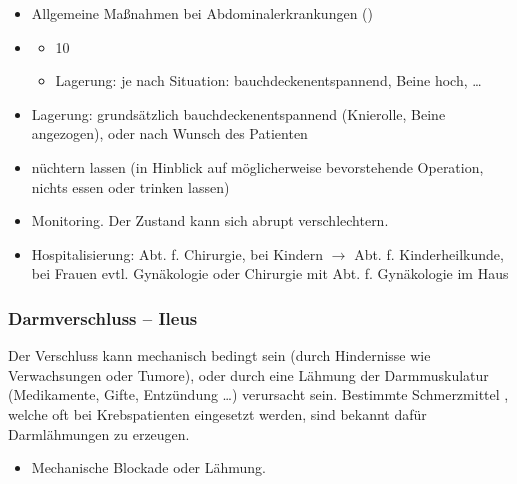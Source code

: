 {\label{m:akutes-abdomen}}
{
\begin{itemize}
  \item Allgemeine Maßnahmen bei Abdominalerkrankungen
  ()
  \item {} \TxBeiVit
  \TxMassVitBes
  \begin{itemize}
    \item {} 10\LMin
    \item Lagerung: je nach Situation: bauchdeckenentspannend,
    Beine hoch, \ldots
  \end{itemize}
  \item Lagerung: grundsätzlich bauchdeckenentspannend
  (Knierolle, Beine angezogen), oder nach Wunsch des Patienten
  \item nüchtern lassen (in Hinblick auf möglicherweise bevorstehende
  Operation, nichts essen oder trinken lassen)
  \item Monitoring. Der Zustand kann sich abrupt
  verschlechtern.
  \item Hospitalisierung: Abt. f. Chirurgie, bei Kindern ${\rightarrow}$
  Abt. f. Kinderheilkunde, bei Frauen evtl. Gynäkologie oder Chirurgie mit
  Abt. f. Gynäkologie im Haus 
\end{itemize}
}


\subsubsection{Darmverschluss -- Ileus}



{%
Der Verschluss kann mechanisch bedingt sein (durch
Hindernisse wie Verwachsungen oder Tumore), oder durch eine
Lähmung der Darmmuskulatur (Medikamente, Gifte, Entzündung
\ldots) verursacht sein. Bestimmte Schmerzmittel
, welche oft bei Krebspatienten eingesetzt
werden, sind bekannt dafür Darmlähmungen zu erzeugen. 
}{
\begin{itemize}
  \item Mechanische Blockade oder Lähmung.
\end{itemize}
}{}{}{}


